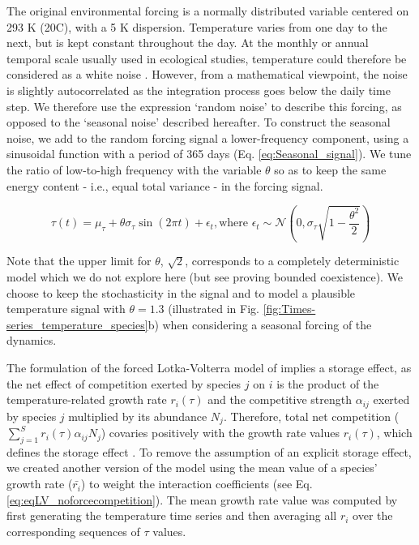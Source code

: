 \documentclass[smallcondensed,referee]{svjour3}       %
\begin{document}
The original environmental forcing is a normally distributed variable
centered on 293 K (20\textdegree C), with a 5 K dispersion. Temperature varies
from one day to the next, but is kept constant throughout the day.
At the monthly or annual temporal scale usually used in ecological
studies, temperature could therefore be considered as a white noise
\citep{vasseur_color_2004}. However, from a mathematical viewpoint,
the noise is slightly autocorrelated as the integration process goes
below the daily time step. We therefore use the expression `random
noise' to describe this forcing, as opposed to the `seasonal noise'
described hereafter. To construct the seasonal noise, we add to the
random forcing signal a lower-frequency component, using a sinusoidal
function with a period of 365 days (Eq. \ref{eq:Seasonal_signal}).
We tune the ratio of low-to-high frequency with the variable $\theta$
so as to keep the same energy content - i.e., equal total variance
- in the forcing signal.

\begin{equation}
\tau(t)=\mu_{\tau}+\theta\sigma_{\tau}\sin\left(2\pi t\right)+\epsilon_{t},\text{where }\epsilon_{t}\sim\mathcal{N}\left(0,\sigma_{\tau}\sqrt{1-\frac{\theta^{2}}{2}}\right)\label{eq:Seasonal_signal}
\end{equation}

Note that the upper limit for $\theta$, $\sqrt{2}$, corresponds
to a completely deterministic model which we do not explore here (but
see \citet{zhao1991qualitative} proving bounded coexistence). We
choose to keep the stochasticity in the signal and to model a plausible
temperature signal with $\theta=1.3$ (illustrated in Fig. \ref{fig:Times-series_temperature_species}b)
when considering a seasonal forcing of the dynamics.

The formulation of the forced Lotka-Volterra model of \citet{scranton_coexistence_2016}
implies a storage effect, as the net effect of competition exerted
by species $j$ on $i$ is the product of the temperature-related
growth rate $r_{i}(\tau)$ and the competitive strength $\alpha_{ij}$
exerted by species $j$ multiplied by its abundance $N_{j}$. Therefore,
total net competition ($\sum_{j=1}^{S}r_{i}(\tau)\alpha_{ij}N_{j}$)
covaries positively with the growth rate values $r_{i}(\tau)$, which
defines the storage effect \citep{chesson_multispecies_1994,fox_intermediate_2013,ellner_how_2016}.
To remove the assumption of an explicit storage effect, we created
another version of the model using the mean value of a species' growth
rate ($\bar{r_{i}}$) to weight the interaction coefficients (see
Eq. \ref{eq:eqLV_noforcecompetition}). The mean growth rate value
was computed by first generating the temperature time series and then
averaging all $r_{i}$ over the corresponding sequences of $\tau$
values. 
\end{document}
